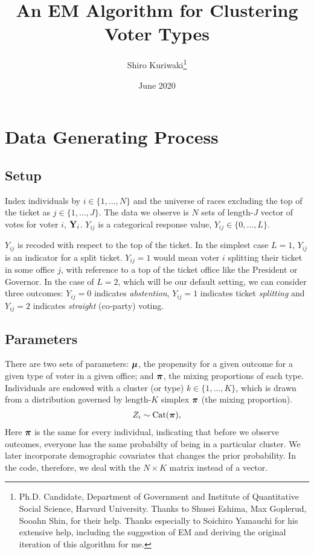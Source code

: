 \documentclass[11pt]{article}
\title{\Large\textbf{An EM Algorithm for Clustering Voter Types}}
\author{\normalsize  Shiro Kuriwaki\thanks{Ph.D. Candidate, Department of Government and Institute of Quantitative Social Science, Harvard University. Thanks to Shusei Eshima, Max Goplerud, Sooahn Shin, for their help. Thanks especially to Soichiro Yamauchi for his extensive help, including the suggestion of EM and deriving the original iteration of this algorithm for me.}}
\date{\normalsize June 2020}
\begin{document}
\maketitle



\begin{center}
\renewcommand*\contentsname{}
\begin{minipage}{0.8\linewidth}
\tableofcontents
\end{minipage}
\end{center}

\onehalfspacing

\newpage

\section{Data Generating Process}


\subsection{Setup}

Index individuals by \(i \in \{1, ..., N\}\) and the universe of races
excluding the top of the ticket as \(j \in \{1, ..., J\}\). The data we
observe is \(N\) sets of  length-\(J\) vector of votes for voter \(i\), \(\mathbf{Y}_i\). \(Y_{ij}\) is a categorical response value, \(Y_{ij} \in \{0, ..., L\}\).

\(Y_{ij}\) is recoded with respect to the top of the ticket. In the simplest case \(L = 1\), \(Y_{ij}\) is an indicator for a split ticket. \(Y_{ij} = 1\) would mean voter \(i\) splitting their ticket in some office \(j\), with reference to a top of the ticket office like the President or Governor. In the case of \(L = 2\), which will be our default setting, we can consider three outcomes: \(Y_{ij} = 0\) indicates \emph{abstention}, \(Y_{ij} = 1\) indicates ticket \emph{splitting} and \(Y_{ij} = 2\) indicates \emph{straight} (co-party) voting.


\subsection{Parameters}


There are two sets of parameters: \(\bm{\mu}\), the propensity for a given outcome for a given type of voter in a given office; and \(\bm{\pi}\), the mixing proportions of each type.  Individuals are endowed with a cluster (or type) \(k \in \{1, ..., K\}\), which is drawn from a distribution governed by length-\(K\) simplex \(\bm{\pi}\) (the mixing proportion).
\begin{align*}
Z_i \sim  \text{Cat}(\bm{\pi}),
\end{align*}
Here \(\bm{\pi}\) is the same for every individual, indicating that before we observe outcomes, everyone has the same probabilty of being in a particular cluster. We later incorporate demographic covariates that changes the prior probability. In the code, therefore, we deal with the \(N \times K\) matrix instead of a vector.
\end{document}
